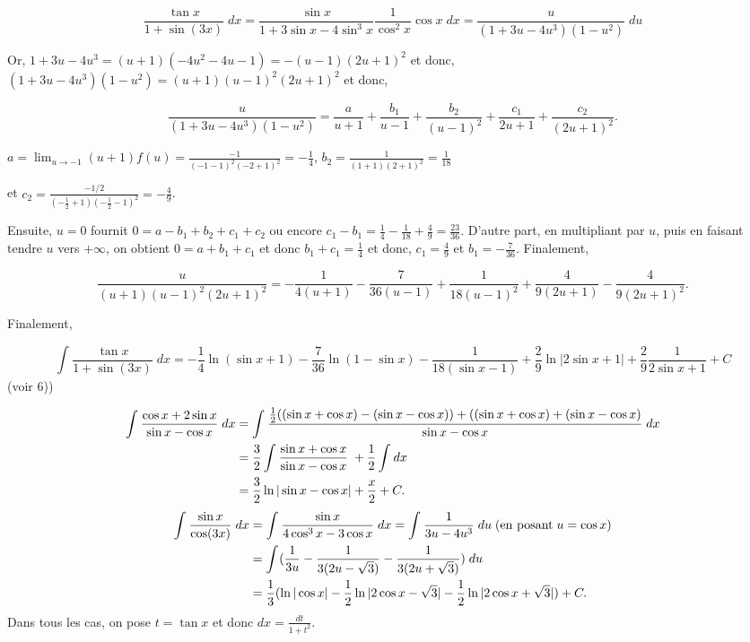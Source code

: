 {{$$\frac{\tan x}{1+\sin(3x)}\;dx=\frac{\sin x}{1+3\sin x-4\sin^3x}\frac{1}{\cos^2x}\cos x\;dx=\frac{u}{(1+3u-4u^3)(1-u^2)}\;du$$

Or, $1+3u-4u^3=(u+1)(-4u^2-4u-1)=-(u-1)(2u+1)^2$ et donc, $(1+3u-4u^3)(1-u^2)=(u+1)(u-1)^2(2u+1)^2$ et donc,

$$\frac{u}{(1+3u-4u^3)(1-u^2)}=\frac{a}{u+1}+\frac{b_1}{u-1}+\frac{b_2}{(u-1)^2}+\frac{c_1}{2u+1}+\frac{c_2}{(2u+1)^2}.$$

$a=\lim_{u\rightarrow -1}(u+1)f(u)=\frac{-1}{(-1-1)^2(-2+1)^2}=-\frac{1}{4}$, $b_2=\frac{1}{(1+1)(2+1)^2}=\frac{1}{18}$

et $c_2=\frac{-1/2}{(-\frac{1}{2}+1)(-\frac{1}{2}-1)^2}=-\frac{4}{9}$.

Ensuite, $u=0$ fournit $0=a-b_1+b_2+c_1+c_2$ ou encore $c_1-b_1=\frac{1}{4}-\frac{1}{18}+\frac{4}{9}=\frac{23}{36}$. D'autre part, en multipliant par $u$, puis en faisant tendre $u$ vers $+\infty$, on obtient $0=a+b_1+c_1$ et donc $b_1+c_1=\frac{1}{4}$ et donc, $c_1=\frac{4}{9}$ et $b_1=-\frac{7}{36}$. Finalement,

$$\frac{u}{(u+1)(u-1)^2(2u+1)^2}=-\frac{1}{4(u+1)}-\frac{7}{36(u-1)}+\frac{1}{18(u-1)^2}+\frac{4}{9(2u+1)}-\frac{4}{9(2u+1)^2}.$$

Finalement,

$$\int_{}^{}\frac{\tan x}{1+\sin(3x)}\;dx=-\frac{1}{4}\ln(\sin x+1)-\frac{7}{36}\ln(1-\sin x)-\frac{1}{18(\sin x-1)}+\frac{2}{9}\ln|2\sin x+1|+\frac{2}{9}\frac{1}{2\sin x+1}+C$$
(voir 6)) 

\begin{align*}\ensuremath
\int_{}^{}\frac{\cos x+2\sin x}{\sin x-\cos x}\;dx&=\int_{}^{}\frac{\frac{1}{2}((\sin x+\cos x)-(\sin x-\cos x))+((\sin x+\cos x)+(\sin x-\cos x)}{\sin x-\cos x}\;dx\\
 &=\frac{3}{2}\int_{}^{}\frac{\sin x+\cos x}{\sin x-\cos x}\;+\frac{1}{2}\int_{}^{}dx\\
 &=\frac{3}{2}\ln|\sin x-\cos x|+\frac{x}{2}+C.
\end{align*}
\begin{align*}\ensuremath
\int_{}^{}\frac{\sin x}{\cos(3x)}\;dx&=\int_{}^{}\frac{\sin x}{4\cos^3x-3\cos x}\;dx
=\int_{}^{}\frac{1}{3u-4u^3}\;du\;(\mbox{en posant}\;u=\cos x)\\
 &=\int_{}^{}(\frac{1}{3u}-\frac{1}{3(2u-\sqrt{3})}-\frac{1}{3(2u+\sqrt{3})})\;du\\
 &=\frac{1}{3}(\ln|\cos x|-\frac{1}{2}\ln|2\cos x-\sqrt{3}|-\frac{1}{2}\ln|2\cos x+\sqrt{3}|)+C.
\end{align*}
Dans tous les cas, on pose $t=\tan x$ et donc $dx=\frac{dt}{1+t^2}$.

}}
